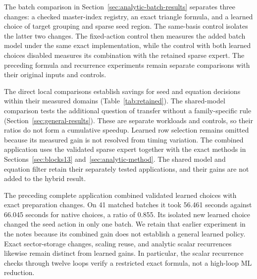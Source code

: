 \documentclass[11pt,a4paper]{article}
\begin{document}
The batch comparison in Section~\ref{sec:analytic-batch-results} separates three changes: a checked master-index registry, an exact triangle formula, and a learned choice of target grouping and sparse seed region. The same-basis control isolates the latter two changes. The fixed-action control then measures the added batch model under the same exact implementation, while the control with both learned choices disabled measures its combination with the retained sparse expert. The preceding formula and recurrence experiments remain separate comparisons with their original inputs and controls.

The direct local comparisons establish savings for seed and equation decisions within their measured domains (Table~\ref{tab:retained}). The shared-model comparison tests the additional question of transfer without a family-specific rule (Section~\ref{sec:general-results}). These are separate workloads and controls, so their ratios do not form a cumulative speedup. Learned row selection remains omitted because its measured gain is not resolved from timing variation. The combined application uses the validated sparse expert together with the exact methods in Sections~\ref{sec:blocks13} and~\ref{sec:analytic-method}. The shared model and equation filter retain their separately tested applications, and their gains are not added to the hybrid result.

The preceding complete application combined validated learned choices with exact preparation changes. On 41 matched batches it took 56.461 seconds against 66.045 seconds for native choices, a ratio of 0.855. Its isolated new learned choice changed the seed action in only one batch. We retain that earlier experiment in the notes because its combined gain does not establish a general learned policy. Exact sector-storage changes, scaling reuse, and analytic scalar recurrences likewise remain distinct from learned gains. In particular, the scalar recurrence checks through twelve loops verify a restricted exact formula, not a high-loop ML reduction.


\appendix
















\clearpage
\renewcommand{\refname}{References}


\end{document}
